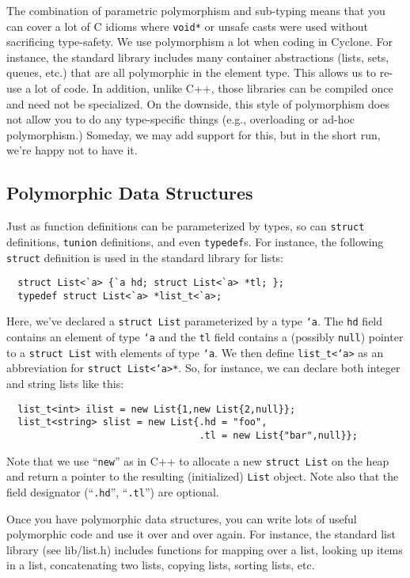 The combination of parametric polymorphism and sub-typing means that
you can cover a lot of C idioms where \texttt{void*} or unsafe casts
were used without sacrificing type-safety.  We use polymorphism a lot
when coding in Cyclone.  For instance, the standard library includes
many container abstractions (lists, sets, queues, etc.) that are all
polymorphic in the element type.  This allows us to re-use a lot of
code.  In addition, unlike C++, those libraries can be compiled once
and need not be specialized.  On the downside, this style of
polymorphism does not allow you to do any type-specific things (e.g.,
overloading or ad-hoc polymorphism.)  Someday, we may add support for
this, but in the short run, we're happy not to have it.


\subsection{Polymorphic Data Structures}
Just as function definitions can be parameterized by types, so can
\texttt{struct} definitions, \texttt{tunion} definitions, and even
\texttt{typedef}s.  For instance, the following \texttt{struct} definition
is used in the standard library for lists:
\begin{verbatim}
  struct List<`a> {`a hd; struct List<`a> *tl; };
  typedef struct List<`a> *list_t<`a>;
\end{verbatim}

Here, we've declared a \texttt{struct List} parameterized by a type
\texttt{`a}.  The \texttt{hd} field contains an element of type \texttt{`a}
and the \texttt{tl} field contains a (possibly \texttt{null}) pointer to a
\texttt{struct List} with elements of type \texttt{`a}.  We then define
\texttt{list_t<`a>} as an abbreviation for \texttt{struct List<`a>*}.  So,
for instance, we can declare both integer and string lists like this:
\begin{verbatim}
  list_t<int> ilist = new List{1,new List{2,null}};
  list_t<string> slist = new List{.hd = "foo",
                                  .tl = new List{"bar",null}};
\end{verbatim}

Note that we use ``\texttt{new}'' as in C++ to allocate a new
\texttt{struct List} on the heap and return a pointer to the resulting
(initialized) \texttt{List} object.  Note also that the field designator
(``\texttt{.hd}'', ``\texttt{.tl}'') are optional.

Once you have polymorphic data structures, you can write lots of
useful polymorphic code and use it over and over again.  For instance,
the standard list library (see lib/list.h) includes functions for
mapping over a list, looking up items in a list, concatenating two
lists, copying lists, sorting lists, etc.

